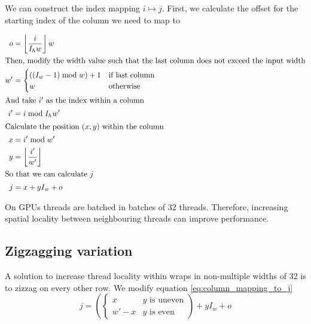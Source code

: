 
We can construct the index mapping $i \mapsto j$. First, we calculate the offset for the starting index of the column we need to map to

\begin{align}
    o  &= \left\lfloor \frac{i}{I_h w} \right\rfloor w
    \\ \intertext{Then, modify the width value such that the last column does not exceed the input width}
    w' &= \begin{cases}
        ((I_w - 1) \bmod w) + 1& \text{if last column}
        \\
        w & \text{otherwise}
    \end{cases}
    \\ \intertext{And take $i'$ as the index within a column}
    i' &= i \bmod I_h w'
    \\ \intertext{Calculate the position $(x, y)$ within the column}
    x & = i' \bmod w'
    \\ 
    y & = \left\lfloor \frac{i'}{w'} \right\rfloor
    \\ \intertext{So that we can calculate $j$}
    \label{eq:column_mapping_to_j}
    j  &= x + y I_w + o
\end{align}



On GPUs threads are batched in batches of 32 threads.
Therefore, increasing spatial locality between neighbouring threads can improve performance.

\subsection{Zigzagging variation}

A solution to increase thread locality within wraps in non-multiple widths of 32 is to zizzag on every other row.
We modify equation \ref{eq:column_mapping_to_j}
\begin{equation}
    j = \left(\begin{cases}
        x & y \text{ is uneven}
        \\
        w' - x & y \text{ is even}
    \end{cases}\right)  + y I_w + o
\end{equation}


